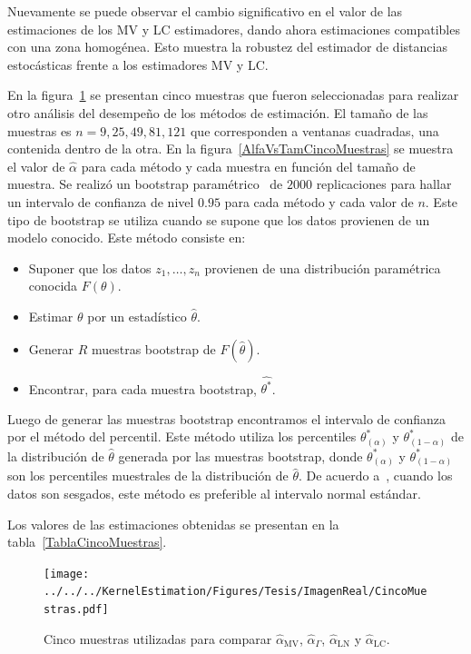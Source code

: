 Nuevamente se puede observar el cambio significativo en el valor de las estimaciones de los MV y LC estimadores, dando ahora estimaciones compatibles con una zona homogénea. Esto muestra la robustez del estimador de distancias estocásticas frente a los estimadores MV y LC.

En la figura~\ref{CincoMuestras} se presentan cinco muestras que fueron seleccionadas para realizar otro análisis del desempeño de los métodos de estimación. El tamaño de las muestras es $n=9,25,49,81,121$ que corresponden a ventanas cuadradas, una contenida dentro de la otra. En la figura~\ref{AlfaVsTamCincoMuestras} se muestra el valor de $\widehat{\alpha}$ para cada método y cada muestra en función del tamaño de muestra. Se realizó un bootstrap paramétrico~\cite{Davison1997} de $2000$ replicaciones para hallar un intervalo de confianza de nivel $0.95$ para cada método y cada valor de $n$. Este tipo de bootstrap se utiliza cuando se supone que los datos provienen de un modelo conocido. Este método consiste en:
\begin{itemize}
	\item Suponer que los datos $z_1,\ldots,z_n$ provienen de una distribución paramétrica conocida $F(\theta)$.
	\item Estimar $\theta$ por un estadístico $\widehat{\theta}$.
	\item Generar $R$ muestras bootstrap de $F(\widehat{\theta})$.
	\item Encontrar, para cada muestra bootstrap, $\widehat{\theta^*}$.
\end{itemize}

Luego de generar las muestras bootstrap encontramos el intervalo de confianza por el método del percentil. Este método utiliza los percentiles $\theta^*_{(\alpha)}$ y $\theta^*_{(1-\alpha)}$ de la distribución de $\widehat{\theta}$ generada por las muestras bootstrap, donde $\theta^*_{(\alpha)}$ y $\theta^*_{(1-\alpha)}$ son los percentiles muestrales de la distribución de $\widehat{\theta}$. De acuerdo a~\cite{Efron93}, cuando los datos son sesgados, este método es preferible al intervalo normal estándar.


Los valores de las estimaciones obtenidas se presentan en la tabla~\ref{TablaCincoMuestras}.
\begin{figure}[htb]
	\centering
	\texttt{[image: ../../../KernelEstimation/Figures/Tesis/ImagenReal/CincoMuestras.pdf]}
	\caption{\label{CincoMuestras}\small Cinco muestras utilizadas para comparar  $\widehat{\alpha}_{\text{MV}}$, $\widehat{\alpha}_{\Gamma}$, $\widehat{\alpha}_{\text{LN}}$ y  $\widehat{\alpha}_{\text{LC}}$.}
\end{figure}


